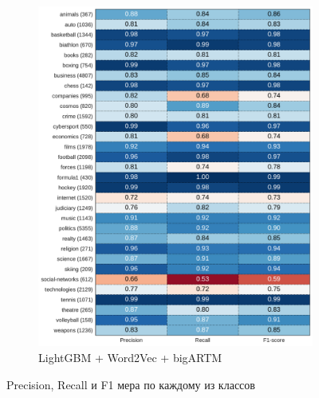 \documentclass[a4paper, 14pt]{extarticle}
\begin{document}
\begin{figure}[t!]
\begin{subfigure}[t]{0.5\textwidth}
		\includegraphics[width=1\textwidth]{lgb_w2v_bigartm_classif_report.pdf}
		\caption{LightGBM + Word2Vec + bigARTM}
	\end{subfigure}
	\caption{Precision, Recall и F1 мера по каждому из классов}
\end{figure}
\end{document}
